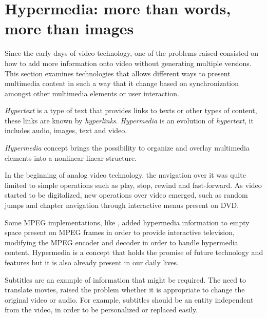 \section{Hypermedia: more than words, more than images}
\label{hypermedia}

Since the early days of video technology, one of the problems raised consisted on how to add more information onto video without generating multiple versions. This section examines technologies that allows different ways to present multimedia content in such a way that it change based on synchronization amongst other multimedia elements or user interaction.

\emph{Hypertext} is a type of text that provides links to texts or other types of content, these links are known by \emph{hyperlinks}. \emph{Hypermedia} is an evolution of \emph{hypertext}, it includes audio, images, text and video. 

\emph{Hypermedia} concept brings the possibility to organize and overlay multimedia elements into a nonlinear linear structure.

In the beginning of analog video technology, the navigation over it was quite limited to simple operations such as play, stop, rewind and fast-forward. As video started to be digitalized, new operations over video emerged, such as random jumps and chapter navigation through interactive menus present on \ac{DVD}.


Some \ac{MPEG} implementations, like \cite{embedded}, added hypermedia information to empty space present on \ac{MPEG} frames in order to provide interactive television, modifying the \ac{MPEG} encoder and decoder in order to handle hypermedia content.
Hypermedia is a concept that holds the promise of future technology and features but it is also already present in our daily lives.

  Subtitles are an example of information that might be required.
  The need to translate movies, raised the problem whether it is appropriate to change the original video or audio. For example, subtitles should be an entity independent from the video, in order to be personalized or replaced easily.

